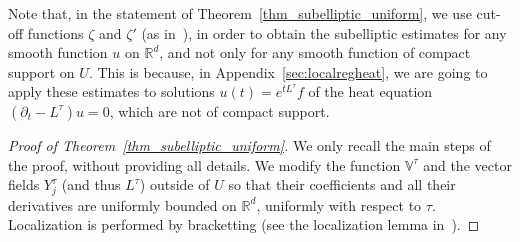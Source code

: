 \documentclass[AHL,Unicode,published]{cedram}
\newcommand*\R{\mathbb{R}}
\newcommand{\bbV}{\mathbb{V}}
\begin{document}
\begin{rema}
Note that, in the statement of Theorem~\ref{thm_subelliptic_uniform}, we use cut-off functions $\zeta$ and $\zeta'$ (as in~\cite{Kohn1973}), in order to obtain the subelliptic estimates for any smooth function $u$ on $\R^d$, and not only for any smooth function of compact support on $U$. This is because, in Appendix~\ref{sec:localregheat}, we are going to apply these estimates to solutions $u(t)=e^{t L^\tau}f$ of the heat equation $(\partial_t-L^\tau)u=0$, which are not of compact support.
\end{rema}


\begin{proof}[Proof of Theorem~\ref{thm_subelliptic_uniform}]
We only recall the main steps of the proof, without providing all details. We modify the function $\bbV^\tau$ and the vector fields $Y_j^\tau$ (and thus $L^\tau$) outside of $U$ so that their coefficients and all their derivatives are uniformly bounded on $\R^d$, uniformly with respect to $\tau$. Localization is performed by bracketting (see the localization lemma in~\cite{Kohn1973}).


\end{proof}
\end{document}
